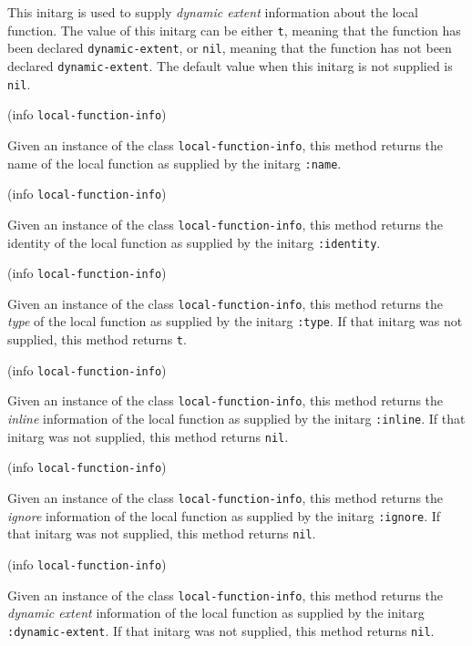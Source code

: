 
This initarg is used to supply \emph{dynamic extent} information about
the local function.  The value of this initarg can be either
\texttt{t}, meaning that the function has been declared
\texttt{dynamic-extent}, or \texttt{nil}, meaning that the function
has not been declared \texttt{dynamic-extent}.  The default value when
this initarg is not supplied is \texttt{nil}. 

 {(info {\tt local-function-info})}

Given an instance of the class \texttt{local-function-info}, this
method returns the name of the local function as supplied by the
initarg \texttt{:name}.

 {(info {\tt local-function-info})}

Given an instance of the class \texttt{local-function-info}, this
method returns the identity of the local function as supplied by the
initarg \texttt{:identity}.

 {(info {\tt local-function-info})}

Given an instance of the class \texttt{local-function-info}, this
method returns the \emph{type} of the local function as supplied by the
initarg \texttt{:type}.  If that initarg was not supplied, this method
returns \texttt{t}.

 {(info {\tt local-function-info})}

Given an instance of the class \texttt{local-function-info}, this
method returns the \emph{inline} information of the local function as
supplied by the initarg \texttt{:inline}.  If that initarg was not
supplied, this method returns \texttt{nil}.

 {(info {\tt local-function-info})}

Given an instance of the class \texttt{local-function-info}, this
method returns the \emph{ignore} information of the local function as
supplied by the initarg \texttt{:ignore}.  If that initarg was not
supplied, this method returns \texttt{nil}.

 {(info {\tt local-function-info})}

Given an instance of the class \texttt{local-function-info}, this
method returns the \emph{dynamic extent} information of the local
function as supplied by the initarg \texttt{:dynamic-extent}.  If that
initarg was not supplied, this method returns \texttt{nil}.

